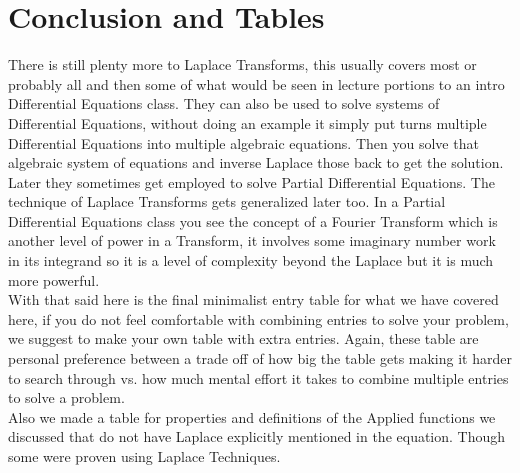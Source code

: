 \documentclass[12pt]{article}
\begin{document}
\section{Conclusion and Tables}

There is still plenty more to Laplace Transforms, this usually covers most or probably all and then some of what would be seen in lecture portions to an intro Differential Equations class. They can also be used to solve systems of Differential Equations, without doing an example it simply put turns multiple Differential Equations into multiple algebraic equations. Then you solve that algebraic system of equations and inverse Laplace those back to get the solution. \\

Later they sometimes get employed to solve Partial Differential Equations. The technique of Laplace Transforms gets generalized later too. In a Partial Differential Equations class you see the concept of a Fourier Transform which is another level of power in a Transform, it involves some imaginary number work in its integrand so it is a level of complexity beyond the Laplace but it is much more powerful. \\

With that said here is the final minimalist entry table for what we have covered here, if you do not feel comfortable with combining entries to solve your problem, we suggest to make your own table with extra entries. Again, these table are personal preference between a trade off of how big the table gets making it harder to search through vs. how much mental effort it takes to combine multiple entries to solve a problem. \\

Also we made a table for properties and definitions of the Applied functions we discussed that do not have Laplace explicitly mentioned in the equation. Though some were proven using Laplace Techniques.
\end{document}
